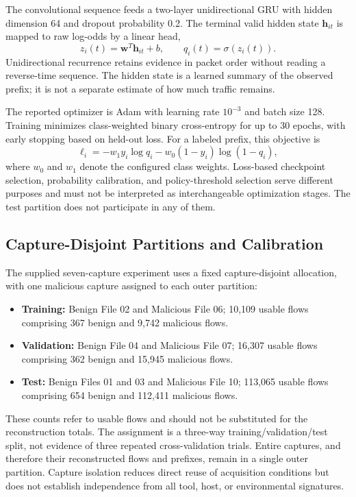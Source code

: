\documentclass[conference]{IEEEtran}
\begin{document}
The convolutional sequence feeds a two-layer unidirectional GRU with hidden dimension 64 and dropout probability 0.2. The terminal valid hidden state $\mathbf{h}_{it}$ is mapped to raw log-odds by a linear head,
\begin{equation}
z_i(t)=\mathbf{w}^{T}\mathbf{h}_{it}+b,
\qquad q_i(t)=\sigma(z_i(t)).
\label{eq:neural_score}
\end{equation}
Unidirectional recurrence retains evidence in packet order without reading a reverse-time sequence. The hidden state is a learned summary of the observed prefix; it is not a separate estimate of how much traffic remains.

The reported optimizer is Adam with learning rate $10^{-3}$ and batch size 128. Training minimizes class-weighted binary cross-entropy for up to 30 epochs, with early stopping based on held-out loss. For a labeled prefix, this objective is
\begin{equation}
\ell_i=-w_1y_i\log q_i-w_0(1-y_i)\log(1-q_i),
\label{eq:weighted_bce}
\end{equation}
where $w_0$ and $w_1$ denote the configured class weights. Loss-based checkpoint selection, probability calibration, and policy-threshold selection serve different purposes and must not be interpreted as interchangeable optimization stages. The test partition does not participate in any of them.

\subsection{Capture-Disjoint Partitions and Calibration}
The supplied seven-capture experiment uses a fixed capture-disjoint allocation, with one malicious capture assigned to each outer partition:
\begin{itemize}
    \item \textbf{Training:} Benign File 02 and Malicious File 06; 10,109 usable flows comprising 367 benign and 9,742 malicious flows.
    \item \textbf{Validation:} Benign File 04 and Malicious File 07; 16,307 usable flows comprising 362 benign and 15,945 malicious flows.
    \item \textbf{Test:} Benign Files 01 and 03 and Malicious File 10; 113,065 usable flows comprising 654 benign and 112,411 malicious flows.
\end{itemize}
These counts refer to usable flows and should not be substituted for the reconstruction totals. The assignment is a three-way training/validation/test split, not evidence of three repeated cross-validation trials. Entire captures, and therefore their reconstructed flows and prefixes, remain in a single outer partition. Capture isolation reduces direct reuse of acquisition conditions but does not establish independence from all tool, host, or environmental signatures.
\end{document}
